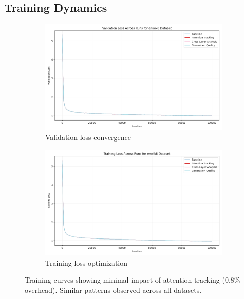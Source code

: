 \documentclass{article} %
\begin{document}
\subsection{Training Dynamics}
\begin{figure}[h]
    \centering
    \begin{subfigure}{0.49\textwidth}
        \includegraphics[width=\textwidth]{val_loss_enwik8.png}
        \caption{Validation loss convergence}
        \label{fig:val_loss}
    \end{subfigure}
    \hfill
    \begin{subfigure}{0.49\textwidth}
        \includegraphics[width=\textwidth]{train_loss_enwik8.png}
        \caption{Training loss optimization}
        \label{fig:train_loss}
    \end{subfigure}
    \caption{Training curves showing minimal impact of attention tracking (0.8\% overhead). Similar patterns observed across all datasets.}
    \label{fig:training_curves}
\end{figure}
\end{document}
